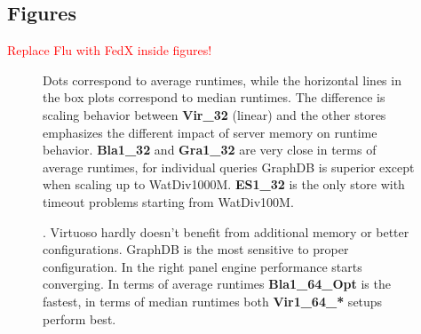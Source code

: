 \documentclass[twocolumn]{bmcart}%
\def\texttt{[image: ]}
\newcommand\todo[1]{\textcolor{red}{#1}}
\begin{document}
\begin{backmatter}



\section*{Figures}

 
\todo{Replace Flu with FedX inside figures!}
  
\begin{figure}[ht!]
	\centering
	\caption{  Dots correspond to average runtimes, while the horizontal lines in the box plots correspond to median runtimes. The difference is scaling behavior between \textbf{Vir\_32} (linear) and the other stores emphasizes the different impact of server memory on runtime behavior. \textbf{Bla1\_32} and \textbf{Gra1\_32} are very close in terms of average runtimes, for individual queries GraphDB is superior except when scaling up to WatDiv1000M. \textbf{ES1\_32} is the only store with timeout problems starting from WatDiv100M. }
	\label{fig:Fig01_WatdivNoSQLDataScaling}
\end{figure} 
   
\begin{figure}[ht!]
	\centering
	\caption{. Virtuoso hardly doesn't benefit from additional memory or better configurations. GraphDB is the most sensitive to proper configuration. In the right panel engine performance starts converging. In terms of average runtimes \textbf{Bla1\_64\_Opt} is the fastest, in terms of median runtimes both \textbf{Vir1\_64\_*} setups perform best.}
	\label{fig:Fig02_WatdivVerticalScaling}
\end{figure}


\end{backmatter}
\end{document}
